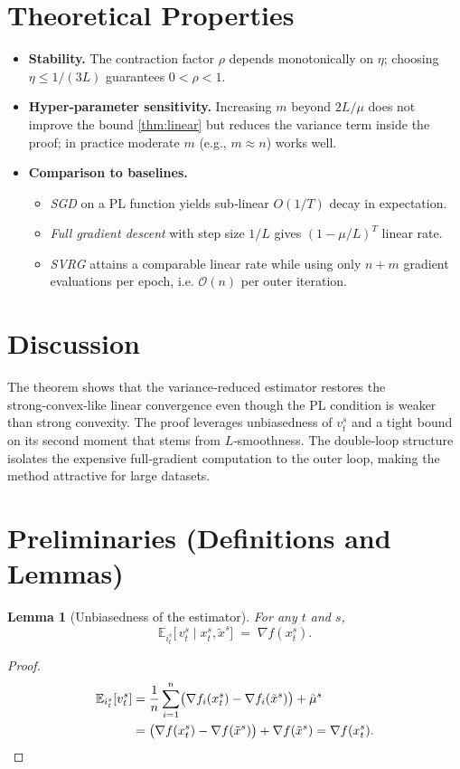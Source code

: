 \documentclass{article}
\newcommand{\E}{\mathbb{E}}
\newtheorem{lemma}{Lemma}
\begin{document}
\section*{Theoretical Properties}
\begin{itemize}
\item \textbf{Stability.} The contraction factor $\rho$ depends monotonically on $\eta$; choosing $\eta\le 1/(3L)$ guarantees $0<\rho<1$.
\item \textbf{Hyper‑parameter sensitivity.} Increasing $m$ beyond $2L/\mu$ does not improve the bound \eqref{thm:linear} but reduces the variance term inside the proof; in practice moderate $m$ (e.g., $m\approx n$) works well.
\item \textbf{Comparison to baselines.}
    \begin{itemize}
        \item \emph{SGD} on a PL function yields sub‑linear $O(1/T)$ decay in expectation.
        \item \emph{Full gradient descent} with step size $1/L$ gives $ (1-\mu/L)^{T}$ linear rate.
        \item \emph{SVRG} attains a comparable linear rate while using only $n+m$ gradient evaluations per epoch, i.e. $\mathcal{O}(n)$ per outer iteration.
    \end{itemize}
\end{itemize}

\section*{Discussion}
The theorem shows that the variance‑reduced estimator restores the strong‑convex‑like linear convergence even though the PL condition is weaker than strong convexity. The proof leverages unbiasedness of $v_t^{s}$ and a tight bound on its second moment that stems from $L$‑smoothness. The double‑loop structure isolates the expensive full‑gradient computation to the outer loop, making the method attractive for large datasets.

\newpage
\section*{Preliminaries (Definitions and Lemmas)}
\begin{lemma}[Unbiasedness of the estimator]\label{lem:unbiased}
For any $t$ and $s$,
\[
\E_{i_t^{s}}\!\bigl[\,v_{t}^{s}\mid x_{t}^{s},\tilde{x}^{s}\bigr]
\;=\;
\nabla f(x_{t}^{s}).
\]
\end{lemma}
\begin{proof}
\[
\begin{aligned}
\E_{i_t^{s}}[v_{t}^{s}]
&=\frac{1}{n}\sum_{i=1}^{n}\bigl(\nabla f_i(x_{t}^{s})-\nabla f_i(\tilde{x}^{s})\bigr)+\tilde{\mu}^{s}\\
&=\bigl(\nabla f(x_{t}^{s})-\nabla f(\tilde{x}^{s})\bigr)+\nabla f(\tilde{x}^{s})
 =\nabla f(x_{t}^{s}).\qedhere
\end{aligned}
\]
\end{proof}
\end{document}
